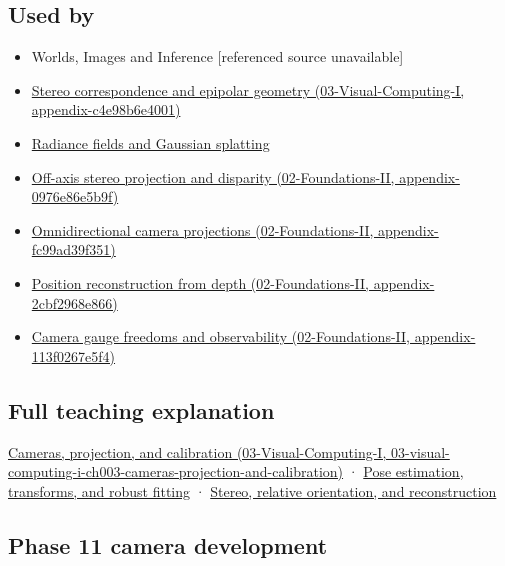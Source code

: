 \subsection{Used by}\label{appendix-3ee9861904d5-used-by}

\begin{itemize}
\item
  {Worlds, Images and Inference {[}referenced source unavailable{]}}
\item
  \href{../03-Visual-Computing-I/main.pdf\#nameddest=appendix-c4e98b6e4001}{Stereo correspondence and epipolar geometry (03-Visual-Computing-I, appendix-c4e98b6e4001)}
\item
  \hyperref[appendix-c5b332e400e7]{Radiance fields and Gaussian splatting}
\item
  \href{../02-Foundations-II/main.pdf\#nameddest=appendix-0976e86e5b9f}{Off-axis stereo projection and disparity (02-Foundations-II, appendix-0976e86e5b9f)}
\item
  \href{../02-Foundations-II/main.pdf\#nameddest=appendix-fc99ad39f351}{Omnidirectional camera projections (02-Foundations-II, appendix-fc99ad39f351)}
\item
  \href{../02-Foundations-II/main.pdf\#nameddest=appendix-2cbf2968e866}{Position reconstruction from depth (02-Foundations-II, appendix-2cbf2968e866)}
\item
  \href{../02-Foundations-II/main.pdf\#nameddest=appendix-113f0267e5f4}{Camera gauge freedoms and observability (02-Foundations-II, appendix-113f0267e5f4)}
\end{itemize}

\subsection{Full teaching explanation}\label{appendix-3ee9861904d5-full-teaching-explanation}

\href{../03-Visual-Computing-I/main.pdf\#nameddest=03-visual-computing-i-ch003-cameras-projection-and-calibration}{Cameras, projection, and calibration (03-Visual-Computing-I, 03-visual-computing-i-ch003-cameras-projection-and-calibration)} · \hyperref[04-visual-computing-ii-ch032-pose-estimation-transforms-and-robust-fitting]{Pose estimation, transforms, and robust fitting} · \hyperref[04-visual-computing-ii-ch032-stereo-relative-orientation-and-reconstruction]{Stereo, relative orientation, and reconstruction}

\subsection{Phase 11 camera development}\label{appendix-3ee9861904d5-phase-11-camera-development}

